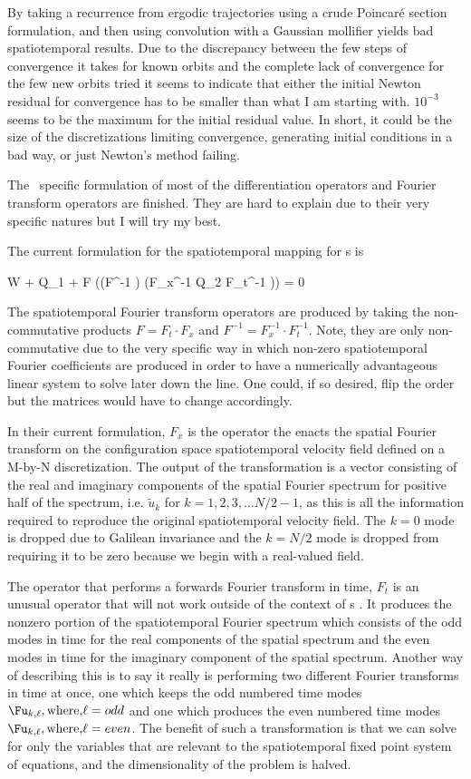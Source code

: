By taking a recurrence from ergodic trajectories using a crude Poincar\'e section
formulation, and then using convolution with a Gaussian mollifier yields bad
spatiotemporal results. Due to the discrepancy between the few steps of convergence
it takes for known orbits and the complete lack of convergence for the few new orbits
tried it seems to indicate that either the initial Newton residual for convergence has
to be smaller than what I am starting with. $10^{-3}$ seems to be the maximum
for the initial residual value.
In short, it could be the size of the discretizations limiting convergence, generating
initial conditions in a bad way, or just Newton's method failing.

The \ppo\ specific formulation of most of the differentiation operators
and Fourier transform operators are finished. They are hard to explain
due to their very specific natures but I will try my best.

The current formulation for the spatiotemporal mapping for {\ppo}s
is

\beq \label{e-spatiotempPPO}
W \cdot \Fu + Q_1 \cdot \Fu + F \cdot ((F^{-1} \cdot \Fu) \ast (F_x^{-1} \cdot Q_2 \cdot F_t^{-1} \cdot \Fu)) = 0
\eeq

The spatiotemporal Fourier transform operators are produced by taking the non-commutative products
$F = F_t \cdot F_x$ and $F^{-1} = F_x^{-1} \cdot F_t^{-1}$. Note, they are only non-commutative due
to the very specific way in which non-zero spatiotemporal Fourier coefficients are produced in order
to have a numerically advantageous linear system to solve later down the line. One could, if so desired,
flip the order but the matrices would have to change accordingly.

In their current formulation, $F_x$ is the operator the enacts the spatial Fourier transform on the
configuration space spatiotemporal velocity field defined on a M-by-N discretization. The output
of the transformation is a vector consisting of the real and imaginary components of the spatial
Fourier spectrum for positive half of the spectrum, i.e. $\tilde{u}_k$ for $k = 1,2,3, \ldots N/2-1$,
as this is all the information required to reproduce the original spatiotemporal velocity field. The
$k=0$ mode is dropped due to Galilean invariance and the $k = N/2$ mode is dropped from requiring it
to be zero because we begin with a real-valued field.

The operator that performs a forwards Fourier transform in time, $F_t$ is an unusual operator that
will not work outside of the context of {\ppo}s . It produces the nonzero portion of the spatiotemporal
Fourier spectrum which consists of the odd modes in time for the real components of the spatial spectrum
and the even modes in time for the imaginary component of the spatial spectrum. Another way of describing
this is to say it really is performing two different Fourier transforms in time at once, one which keeps the odd
numbered time modes $\Fu_{k,\ell}, \mbox{where,} \ell = odd$ and one which produces the even numbered time
modes $\Fu_{k,\ell}, \mbox{where,} \ell = even$. The benefit of such a transformation is that we can solve
for only the variables that are relevant to the spatiotemporal fixed point system of equations, and the
dimensionality of the problem is halved.


